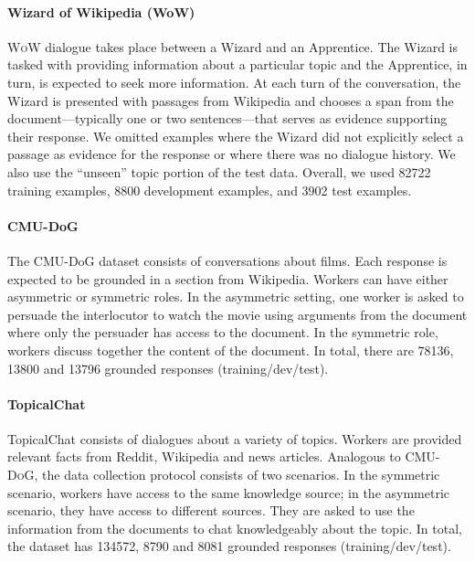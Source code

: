 \paragraph{Wizard of Wikipedia (WoW)} \textsc{WoW} dialogue \cite{dinan2018wizard} takes place between a Wizard and an Apprentice. The Wizard is tasked with providing information about a particular topic and the Apprentice, in turn, is expected to seek more information.
At each turn of the conversation, the Wizard is presented with passages from Wikipedia and chooses a span from the document---typically one or two sentences---that serves as evidence supporting their response.
We omitted examples where the Wizard did not explicitly select a passage as evidence for the response or where there was no dialogue history.  We also use the ``unseen'' topic portion of the test data. Overall, we used 82722 training examples, 8800 development examples, and 3902 test examples.

\paragraph{CMU-DoG} The CMU-DoG dataset \cite{zhou-etal-2018-dataset} consists of conversations about films. Each response is expected to be grounded in a section from Wikipedia. Workers can have either asymmetric or symmetric roles. In the asymmetric setting, one worker is asked to persuade the interlocutor to watch the movie using arguments from the document where only the persuader has access to the document. In the symmetric role, workers discuss together the content of the document. In total, there are 78136, 13800 and 13796 grounded responses (training/dev/test).
  
\paragraph{TopicalChat} TopicalChat \cite{Gopalakrishnan2019} consists of dialogues about a variety of topics. Workers are provided relevant facts from Reddit, Wikipedia and news articles. Analogous to \textsc{CMU-DoG}, the data collection protocol consists of two scenarios. In the symmetric scenario, workers have access to the same knowledge source; in the asymmetric scenario, they have access to different sources. They are asked to use the information from the documents to chat knowledgeably about the topic. In total, the dataset has 134572, 8790 and 8081 grounded responses (training/dev/test).

